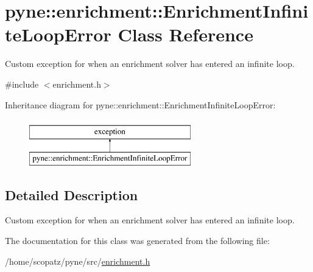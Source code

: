 \hypertarget{classpyne_1_1enrichment_1_1_enrichment_infinite_loop_error}{\section{pyne\-:\-:enrichment\-:\-:Enrichment\-Infinite\-Loop\-Error Class Reference}
\label{classpyne_1_1enrichment_1_1_enrichment_infinite_loop_error}
}


Custom exception for when an enrichment solver has entered an infinite loop.  




{\ttfamily \#include $<$enrichment.\-h$>$}

Inheritance diagram for pyne\-:\-:enrichment\-:\-:Enrichment\-Infinite\-Loop\-Error\-:\begin{figure}[H]
\begin{center}
\leavevmode
\includegraphics[height=2.000000cm]{classpyne_1_1enrichment_1_1_enrichment_infinite_loop_error}
\end{center}
\end{figure}


\subsection{Detailed Description}
Custom exception for when an enrichment solver has entered an infinite loop. 

The documentation for this class was generated from the following file\-:\begin{DoxyCompactItemize}
\item 
/home/scopatz/pyne/src/\hyperlink{enrichment_8h}{enrichment.\-h}\end{DoxyCompactItemize}
